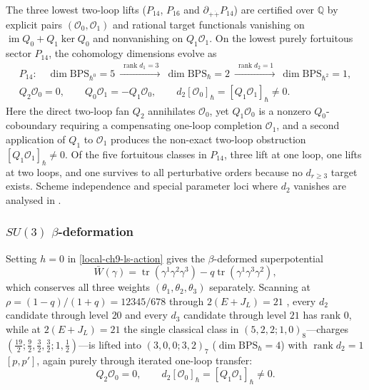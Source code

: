 \documentclass[11pt]{article}
\numberwithin{equation}{section}
\numberwithin{figure}{section}
\numberwithin{table}{section}
\begin{document}
The three lowest two-loop lifts ($P_{14}$, $P_{16}$ and $\partial_{+\dot+}P_{14}$) are certified over $\mathbb Q$ by explicit pairs $(\mathcal O_0,\mathcal O_1)$ and rational target functionals vanishing on $\operatorname{im}Q_0+Q_1\ker Q_0$ and nonvanishing on $Q_1\mathcal O_1$. On the lowest purely fortuitous sector $P_{14}$, the cohomology dimensions evolve as
\begin{equation}\label{local-ch9-ls-first-pages}
\begin{gathered}
P_{14}:\quad
\dim\mathrm{BPS}_{\hbar^0}=5\ \xrightarrow{\ \operatorname{rank}d_1=3\ }\
\dim\mathrm{BPS}_{\hbar}=2\ \xrightarrow{\ \operatorname{rank}d_2=1\ }\
\dim\mathrm{BPS}_{\hbar^2}=1,\\
Q_2\mathcal O_0=0,\qquad
Q_0\mathcal O_1=-Q_1\mathcal O_0,\qquad
d_2[\mathcal O_0]_{\hbar}=[Q_1\mathcal O_1]_{\hbar}\ne0.
\end{gathered}
\end{equation}
Here the direct two-loop fan $Q_2$ annihilates $\mathcal O_0$, yet $Q_1\mathcal O_0$ is a nonzero $Q_0$-coboundary requiring a compensating one-loop completion $\mathcal O_1$, and a second application of $Q_1$ to $\mathcal O_1$ produces the non-exact two-loop obstruction $[Q_1\mathcal O_1]_{\hbar}\ne0$. Of the five fortuitous classes in $P_{14}$, three lift at one loop, one lifts at two loops, and one survives to all perturbative orders because no $d_{r\ge3}$ target exists. Scheme independence and special parameter loci where $d_2$ vanishes are analysed in \cite[supplement, Sections S6.4--S6.5]{Repo}.

\subsubsection{$SU(3)$ $\beta$-deformation}\label{sec-results-beta}

Setting $h=0$ in \eqref{local-ch9-ls-action} gives the $\beta$-deformed superpotential
\begin{equation}\label{local-ch9-beta-action}
\bar W(\gamma)=\operatorname{tr}(\gamma^1\gamma^2\gamma^3)-q\operatorname{tr}(\gamma^1\gamma^3\gamma^2),
\end{equation}
which conserves all three weights $(\theta_1,\theta_2,\theta_3)$ separately. Scanning at $\rho=(1-q)/(1+q)=12345/678$ through $2(E+J_L)=21$ \cite[supplement, Section S6.7]{Repo}, every $d_2$ candidate through level $20$ and every $d_3$ candidate through level $21$ has rank $0$, while at $2(E+J_L)=21$ the single classical class in $(5,2,2;1,0)_8$---charges $(\tfrac{19}2;\tfrac92,\tfrac32,\tfrac32;1,\tfrac12)$---is lifted into $(3,0,0;3,2)_7$ ($\dim\mathrm{BPS}_{\hbar}=4$) with $\operatorname{rank}d_2=1$ $[p,p']$, again purely through iterated one-loop transfer:
\begin{equation}\label{local-ch9-beta-first-lift}
Q_2\mathcal O_0=0,\qquad
d_2[\mathcal O_0]_{\hbar}=[Q_1\mathcal O_1]_{\hbar}\ne0.
\end{equation}
\end{document}
